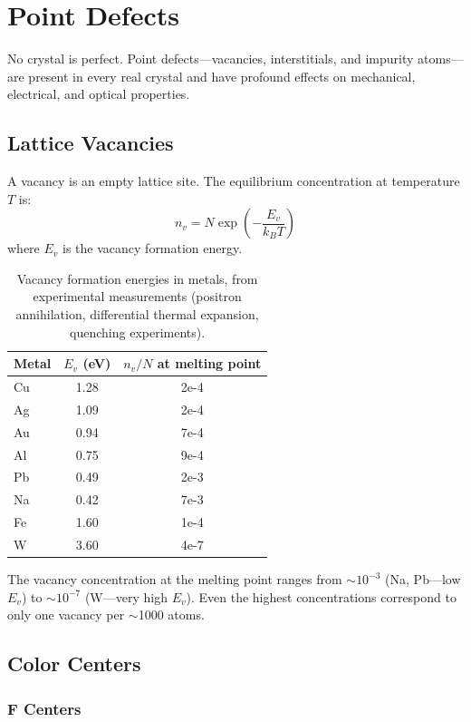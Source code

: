 \chapter{Point Defects}

No crystal is perfect. Point defects---vacancies, interstitials, and impurity atoms---are present in every real crystal and have profound effects on mechanical, electrical, and optical properties.

\section{Lattice Vacancies}

A vacancy is an empty lattice site. The equilibrium concentration at temperature $T$ is:
\begin{equation}
  n_v = N\exp\left(-\frac{E_v}{k_BT}\right)
\end{equation}
where $E_v$ is the vacancy formation energy.

\begin{table}[H]
\centering
\caption{Vacancy formation energies in metals, from experimental measurements (positron annihilation, differential thermal expansion, quenching experiments).}
\label{tab:vacancy}
\begin{tabular}{@{}lSS@{}}
\toprule
Metal & {$E_v$ (\si{\electronvolt})} & {$n_v/N$ at melting point} \\
\midrule
Cu & 1.28 & 2e-4 \\
Ag & 1.09 & 2e-4 \\
Au & 0.94 & 7e-4 \\
Al & 0.75 & 9e-4 \\
Pb & 0.49 & 2e-3 \\
Na & 0.42 & 7e-3 \\
Fe & 1.60 & 1e-4 \\
W  & 3.60 & 4e-7 \\
\bottomrule
\end{tabular}
\end{table}

The vacancy concentration at the melting point ranges from $\sim 10^{-3}$ (Na, Pb---low $E_v$) to $\sim 10^{-7}$ (W---very high $E_v$). Even the highest concentrations correspond to only one vacancy per $\sim$1000 atoms.

\section{Color Centers}

\subsection{F Centers}

